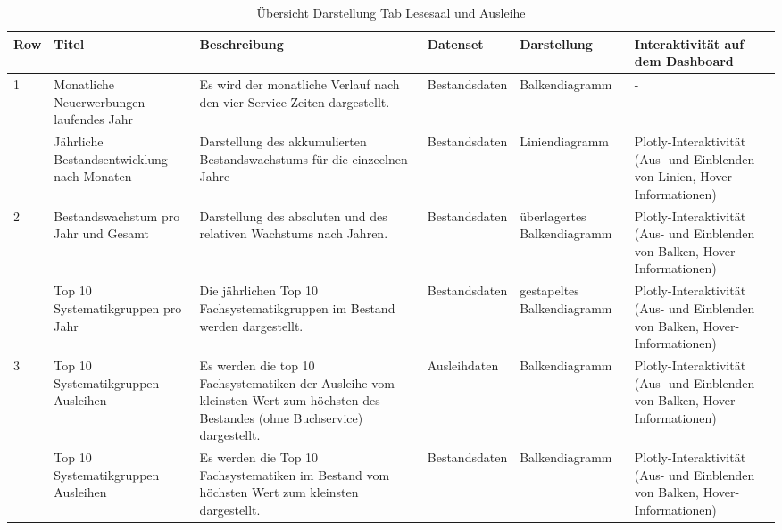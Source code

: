     \begingroup
    \setlength{\tabcolsep}{12pt} %
    \renewcommand{\arraystretch}{1.5} 
    \begin{table}[h]
        \centering
        \begin{adjustbox}{max width=\textwidth}
        \begin{tabular}{p{}p{}p{}p{}p{}p{}}
           \toprule
           Row        &Titel &Beschreibung &Datenset &Darstellung &Interaktivität auf dem Dashboard\\
           \midrule
            1           &Monatliche Neuerwerbungen laufendes Jahr&Es wird der monatliche Verlauf nach den vier Service-Zeiten dargestellt.&Bestandsdaten&Balkendiagramm&-\\
                        &Jährliche Bestandsentwicklung nach Monaten&Darstellung des akkumulierten Bestandswachstums für die einzeelnen Jahre&Bestandsdaten&Liniendiagramm    &Plotly-Interaktivität (Aus- und Einblenden von Linien, Hover-Informationen)\\          
            \midrule
            2           &Bestandswachstum pro Jahr und Gesamt&Darstellung des absoluten und des relativen Wachstums nach Jahren.&Bestandsdaten&überlagertes Balkendiagramm&Plotly-Interaktivität (Aus- und Einblenden von Balken, Hover-Informationen)\\
                        &Top 10 Systematikgruppen pro Jahr&Die jährlichen Top 10 Fachsystematikgruppen im Bestand werden dargestellt.&Bestandsdaten    &gestapeltes Balkendiagramm&Plotly-Interaktivität (Aus- und Einblenden von Balken, Hover-Informationen)\\
            \midrule
            3           &Top 10 Systematikgruppen Ausleihen&Es werden die top 10 Fachsystematiken der Ausleihe vom kleinsten Wert zum höchsten des Bestandes (ohne Buchservice) dargestellt.&Ausleihdaten&Balkendiagramm&Plotly-Interaktivität (Aus- und Einblenden von Balken, Hover-Informationen)\\
                        &Top 10 Systematikgruppen Ausleihen&Es werden die Top 10 Fachsystematiken im Bestand vom höchsten Wert zum kleinsten dargestellt.&Bestandsdaten&Balkendiagramm&Plotly-Interaktivität (Aus- und Einblenden von Balken, Hover-Informationen)\\

        \bottomrule
        \end{tabular}
        \end{adjustbox}
        \caption{%
            Übersicht Darstellung Tab Lesesaal und Ausleihe
        }
        \label{tab:Darstellung Tab Lesesaal und Ausleihe}
        \end{table}
    \endgroup

